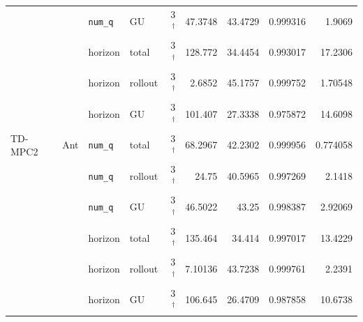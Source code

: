 {\begin{longtable}{@{}llllrrrrr@{}}
     &  & \texttt{num\_\allowbreak q} & GU & \num{3}$^{\dagger}$ & \num{47.3748} & \num{43.4729} & \num{0.999316} & \num{1.9069} \\
     &  & horizon & total & \num{3}$^{\dagger}$ & \num{128.772} & \num{34.4454} & \num{0.993017} & \num{17.2306} \\
     &  & horizon & rollout & \num{3}$^{\dagger}$ & \num{2.6852} & \num{45.1757} & \num{0.999752} & \num{1.70548} \\
     &  & horizon & GU & \num{3}$^{\dagger}$ & \num{101.407} & \num{27.3338} & \num{0.975872} & \num{14.6098} \\
    TD-MPC2 & Ant & \texttt{num\_\allowbreak q} & total & \num{3}$^{\dagger}$ & \num{68.2967} & \num{42.2302} & \num{0.999956} & \num{0.774058} \\
     &  & \texttt{num\_\allowbreak q} & rollout & \num{3}$^{\dagger}$ & \num{24.75} & \num{40.5965} & \num{0.997269} & \num{2.1418} \\
     &  & \texttt{num\_\allowbreak q} & GU & \num{3}$^{\dagger}$ & \num{46.5022} & \num{43.25} & \num{0.998387} & \num{2.92069} \\
     &  & horizon & total & \num{3}$^{\dagger}$ & \num{135.464} & \num{34.414} & \num{0.997017} & \num{13.4229} \\
     &  & horizon & rollout & \num{3}$^{\dagger}$ & \num{7.10136} & \num{43.7238} & \num{0.999761} & \num{2.2391} \\
     &  & horizon & GU & \num{3}$^{\dagger}$ & \num{106.645} & \num{26.4709} & \num{0.987858} & \num{10.6738} \\
  \end{longtable}
}

